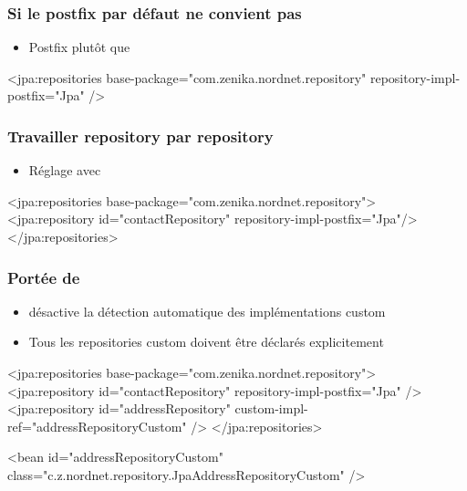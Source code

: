 \begin{frame}[fragile]
 \frametitle{Si le postfix par défaut ne convient pas}
 \begin{itemize}
  \item Postfix  plutôt que 
 \end{itemize}
 \begin{xmlcode}
<jpa:repositories base-package="com.zenika.nordnet.repository" 
                  repository-impl-postfix="Jpa" /> 
 \end{xmlcode}
\end{frame}

\begin{frame}[fragile]
 \frametitle{Travailler repository par repository}
 \begin{itemize}
  \item Réglage avec 
 \end{itemize}
 \begin{xmlcode}
<jpa:repositories base-package="com.zenika.nordnet.repository">
  <jpa:repository id="contactRepository" 
                  repository-impl-postfix="Jpa"/>
</jpa:repositories>
 \end{xmlcode}
\end{frame}

\begin{frame}[fragile]
 \frametitle{Portée de }
 \begin{itemize}
  \item {} désactive la détection automatique des implémentations custom
  \item Tous les repositories custom doivent être déclarés explicitement
 \end{itemize}
 \begin{xmlcode}
<jpa:repositories base-package="com.zenika.nordnet.repository">
  <jpa:repository id="contactRepository" 
                  repository-impl-postfix="Jpa" />
  <jpa:repository id="addressRepository" 
                  custom-impl-ref="addressRepositoryCustom" />
</jpa:repositories>

<bean id="addressRepositoryCustom" 
      class="c.z.nordnet.repository.JpaAddressRepositoryCustom" />
 \end{xmlcode}
\end{frame}